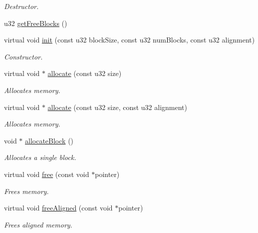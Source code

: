 \begin{DoxyCompactItemize}
\begin{DoxyCompactList}\small\item\em Destructor. \end{DoxyCompactList}\item 
u32 \hyperlink{classDE_1_1PoolAllocator_abb72ae0c4f9cc376cdab99095bd02575}{get\+Free\+Blocks} ()
\item 
virtual void \hyperlink{classDE_1_1PoolAllocator_a340a5f8a77630035bde916c21c1d4783}{init} (const u32 block\+Size, const u32 num\+Blocks, const u32 alignment)
\begin{DoxyCompactList}\small\item\em Constructor. \end{DoxyCompactList}\item 
virtual void $\ast$ \hyperlink{classDE_1_1PoolAllocator_a145223d6697c2f9ad9bbab65ea0cb1b3}{allocate} (const u32 size)
\begin{DoxyCompactList}\small\item\em Allocates memory. \end{DoxyCompactList}\item 
virtual void $\ast$ \hyperlink{classDE_1_1PoolAllocator_ad35d3c065c766c42534f04d6c6adeed6}{allocate} (const u32 size, const u32 alignment)
\begin{DoxyCompactList}\small\item\em Allocates memory. \end{DoxyCompactList}\item 
void $\ast$ \hyperlink{classDE_1_1PoolAllocator_a1213fac1617eb643b185e03704e1d0f1}{allocate\+Block} ()
\begin{DoxyCompactList}\small\item\em Allocates a single block. \end{DoxyCompactList}\item 
virtual void \hyperlink{classDE_1_1PoolAllocator_ac8566e6920e0f34f70c2f76758fbb68a}{free} (const void $\ast$pointer)
\begin{DoxyCompactList}\small\item\em Frees memory. \end{DoxyCompactList}\item 
virtual void \hyperlink{classDE_1_1PoolAllocator_af20c44a50efd12448f87b268e308fc92}{free\+Aligned} (const void $\ast$pointer)
\begin{DoxyCompactList}\small\item\em Frees aligned memory. \end{DoxyCompactList}\end{DoxyCompactItemize}
